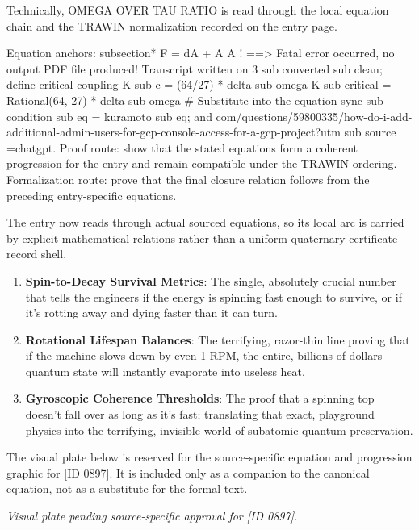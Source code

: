 Technically, OMEGA OVER TAU RATIO is read through the local equation chain and the TRAWIN normalization recorded on the entry page.

Equation anchors: subsection* F = dA + A   A ! ==> Fatal error occurred, no output PDF file produced! Transcript written on 3 sub converted sub clean; define critical coupling K sub c = (64/27) * delta sub omega K sub critical = Rational(64, 27) * delta sub omega \# Substitute into the equation sync sub condition sub eq = kuramoto sub eq; and com/questions/59800335/how-do-i-add-additional-admin-users-for-gcp-console-access-for-a-gcp-project?utm sub source =chatgpt. Proof route: show that the stated equations form a coherent progression for the entry and remain compatible under the TRAWIN ordering. Formalization route: prove that the final closure relation follows from the preceding entry-specific equations.

The entry now reads through actual sourced equations, so its local arc is carried by explicit mathematical relations rather than a uniform quaternary certificate record shell.
\endgroup

\begin{enumerate}[leftmargin=1.6em,itemsep=6pt,topsep=4pt]
\item \textbf{Spin-to-Decay Survival Metrics}: The single, absolutely crucial number that tells the engineers if the energy is spinning fast enough to survive, or if it's rotting away and dying faster than it can turn.
\item \textbf{Rotational Lifespan Balances}: The terrifying, razor-thin line proving that if the machine slows down by even 1 RPM, the entire, billions-of-dollars quantum state will instantly evaporate into useless heat.
\item \textbf{Gyroscopic Coherence Thresholds}: The proof that a spinning top doesn't fall over as long as it's fast; translating that exact, playground physics into the terrifying, invisible world of subatomic quantum preservation.
\end{enumerate}

\begingroup\footnotesize\sloppy
The visual plate below is reserved for the source-specific equation and progression graphic for [ID 0897]. It is included only as a companion to the canonical equation, not as a substitute for the formal text.
\par\endgroup
\begingroup\footnotesize\itshape
Visual plate pending source-specific approval for [ID 0897].
\par\endgroup


